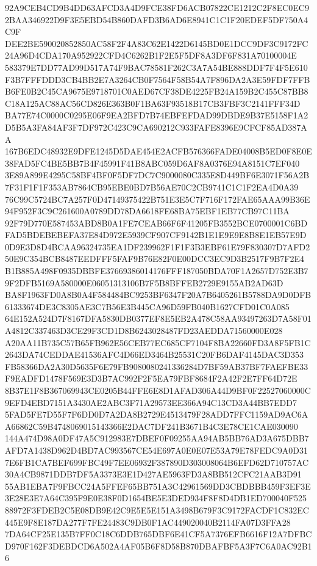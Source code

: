 \documentclass[UTF8,fontset=fandol,zihao=-4,a4paper]{ctexart}
\begin{document}
{{92A9CEB4CD9B4DD63AFCD3A4D9FCE38FD6ACB07822CE1212C2F8EC0EC92BAA346922D9F3E5EBD54B860DAFD3B6AD6E8941C1C1F20EDEF5DF750A4C9F
DEE2BE590020852850AC58F2F4A83C62E1422D6145BD0E1DCC9DF3C9172FC24A96D4CDA170A952922CFD4C6262B1F2E5F5DF8A3DF6F831A70100004E
583379E7DD77AD99D517A74F9BAC78581F262C3A7A54BE888DDF7F4F5E610F3B7FFFDDD3CB4BB2E7A3264CB0F7564F58B54A7F896DA2A3E59FDF7FFB
B6FE0B2C45CA9675E9718701C0AED67CF38DE4225FB24A159B2C455C87BB8C18A125AC88AC56CD826E363B0F1BA63F93518B17CB3FBF3C2141FFF34D
BA77E74C0000C0295E06F9EA2BFD7B74EBFEFDAD99DBDE9B37E5158F1A2D5B5A3FA84AF3F7DF972C423C9CA690212C933FAFE8396E9CFCF85AD387AA
167B6EDC48932E9DFE1245D5DAE454E2ACFB576366FADE04008B5ED0F8E0E38FAD5FC4BE5BB7B4F45991F41B8ABC059D6AF8A0376E94A8151C7EF040
3E89A899E4295C58BF4BF0F5DF7DC7C9000080C335E8D449BF6E3071F56A2B7F31F1F1F353AB7864CB95EBE0BD7B56AE70C2CB9741C1C1F2EA4D0A39
76C99C5724BC7A257F0D47149375422B751E3E5C7F716F172FAE65AAA99B36E94F952F3C9C261600A0789DD78DA6618FE68BA75EBF1EB77CB97C11BA
92F79D770E587453ABD8B0A1FE7CEAB66F6F41205FB3552BCE0700001C6BDFAD5BDEBEBEFA37E84D972E5939CF907CF9142B1E1E9E9E8B8E1EB57E9D
0D9E3D8D4BCAA96324735EA1DF239962F1F1F3B3EBF61E79F830307D7AFD250E9C354BCB8487EEDFFF5FAF9B76E82F0E00DCC3EC9D3B2517F9B7F2E4
B1B885A498F0935DBBFE37669386014176FFF187050BDA70F1A2657D752E3B79F2DFB5169A580000E06051313106B7F5B8BFFEB2729E9155AB2AD63D
BA8F1963FD0A8B0A4F584484BC9253BF6347F20A7B6405261B5788DA9D0DFB61333674DE3C8305AE3C7B56E3B445CA96D59FB040B1627CFD01C0A085
64E152A524D7F8167DFA5830DB0377EF8E5EB2A478C58AA93497263D7A58F01A4812C337463D3CE29F3CD1D8B6243028487FD23AEDDA71560000E028
A20AA11B735C57B65FB962E56CEB77EC685CF7104F8BA22660FD3A8F5FB1C2643DA74CEDDAE41536AFC4D66ED3464B25531C20FB6DAF4145DAC3D353
FB58366DA2A30D5635F6E79FB9080080241336284D7BF59AB37BF7FAEFBE33F9EADFD1478F569E3D3B7AC992F2F5EA79FBF8684F2A42F2E7FF64D72E
8B37E1F8B367069943CE0205B44FFE6E8D1AFAD306A44D9BF0F22527060000C9EFD4EBD7151A3430AE2ABC3F71A29573EE366A94C13CD3A44BB7EDD7
5FAD5FE7D55F7F6DD0D7A2DA8B2729E4513479F28ADD7FFC1159AD9AC6AA66862C59B4748069015143366E2DAC7DF241B3671B4C3E78CE1CAE030090
144A474D98A0DF47A5C912983E7DBEF0F09255AA94AB5BB76AD3A675DBB7AFD7A1438D962D4BD7AC993567CE54E697A0E0E07E53A79E78FEDC9A0D31
7E6FB1CA7BEF699FBC49F7EE06932F387890D303008064B6EFD62D710757AC30A4CB9871DDB7DF5A3373E3E1D427AE5963FD3A8BB512CFC21AAB3D91
55AB1EBA7F9FBCC24A5FFEF65BB751A3C42961569DD3CBDBBB459F3EF3E3E28E3E7A64C395F9E0E38F0D1654BE5E3DED934F8F8D4DB1ED700040F525
88972F3FDEB2C5E08DB9E42C9E5E5E151A3498B679F3C9172FACDF1C832EC445E9F8E187DA277F7FE24483C9DB0F1AC449020040B2114FA07D3FFA28
7DA64CF25E135B7FF0C18C6DDB765DBF6E41CF5A7376EFB6616F12A7DFBCD970F162F3DEBDCD6A502A4AF05B6F8D58B870DBAFBF5A3F7C6A0AC92B16
}}
\end{document}
